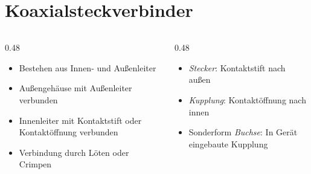 
\section{Koaxialsteckverbinder}
\label{section:koaxsteckverbinder}
\begin{frame}%

    \begin{columns}
        \begin{column}{0.48\textwidth}
            \begin{itemize}
                \item Bestehen aus Innen- und Außenleiter
                \item Außengehäuse mit Außenleiter verbunden
                \item Innenleiter mit Kontaktstift oder Kontaktöffnung verbunden
                \item Verbindung durch Löten oder Crimpen
            \end{itemize}

        \end{column}
        \begin{column}{0.48\textwidth}
            \begin{itemize}
                \item \emph{Stecker}: Kontaktstift nach außen
                \item \emph{Kupplung}: Kontaktöffnung nach innen
                \item Sonderform \emph{Buchse}: In Gerät eingebaute Kupplung
            \end{itemize}

        \end{column}
    \end{columns}

\end{frame}

